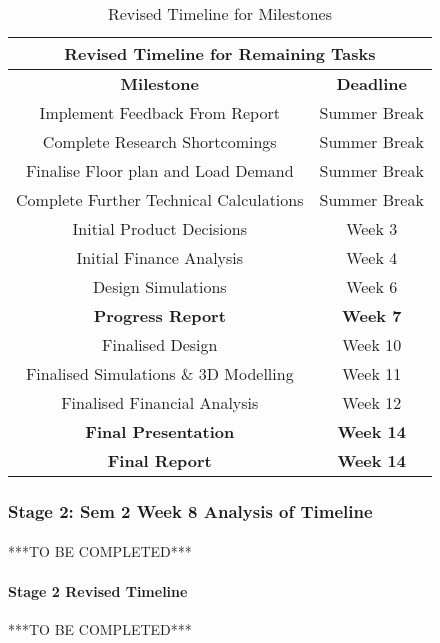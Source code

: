 \begin{table}[H]
\centering
\begin{tabular}{||c c||} 
 \hline
 \multicolumn{2}{|c|}{\textbf{Revised Timeline for Remaining Tasks}} \\ \hline\hline
 \textbf{Milestone} & \textbf{Deadline}\\ [0.5ex] 
 \hline\hline
 Implement Feedback From Report & Summer Break  \\
 Complete Research Shortcomings & Summer Break  \\
 Finalise Floor plan and Load Demand & Summer Break  \\
 Complete Further Technical Calculations & Summer Break  \\
 Initial Product Decisions & Week 3  \\
 Initial Finance Analysis & Week 4  \\
 Design Simulations & Week 6  \\ 
 \textbf{Progress Report} & \textbf{Week 7}  \\
 Finalised Design & Week 10  \\
 Finalised Simulations \& 3D Modelling & Week 11  \\
 Finalised Financial Analysis & Week 12  \\ 
 \textbf{Final Presentation} & \textbf{Week 14} \\
 \textbf{Final Report} & \textbf{Week 14} \\ [1ex] 
 \hline
\end{tabular}
\caption{Revised Timeline for Milestones}
\label{table:milestones_3}
\end{table} 

\subsubsection{Stage 2: Sem 2 Week 8 Analysis of Timeline}

\paragraph{}
***TO BE COMPLETED***

\paragraph{Stage 2 Revised Timeline}
***TO BE COMPLETED***
